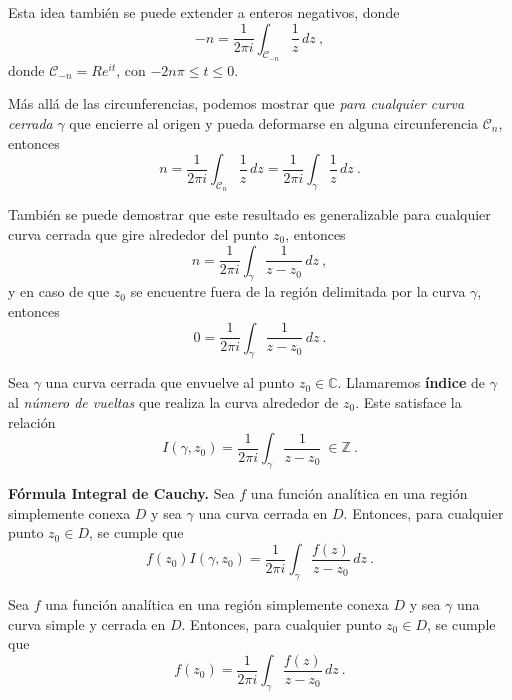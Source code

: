 Esta idea también se puede extender a enteros negativos, donde 
\begin{equation}
    -n = \frac{1}{2\pi i} \int_{\mathcal{C}_{-n}} \frac{1}{z} \, dz \ ,
\end{equation}
donde $\mathcal{C}_{-n} = Re^{it}$, con $-2n\pi \leq t \leq 0$.

Más allá de las circunferencias, podemos mostrar que \emph{para cualquier curva cerrada} $\gamma$ que encierre al origen y pueda deformarse en alguna circunferencia $\mathcal{C}_n$, entonces 
\begin{equation}
    n = \frac{1}{2\pi i} \int_{\mathcal{C}_n} \frac{1}{z} \, dz = \frac{1}{2\pi i} \int_{\gamma} \frac{1}{z} \, dz \ .
\end{equation}

También se puede demostrar que este resultado es generalizable para cualquier curva cerrada que gire alrededor del punto $z_0$, entonces 
\begin{equation*}
    n = \frac{1}{2\pi i} \int_{\gamma} \frac{1}{z-z_0} \, dz \ ,
\end{equation*} 
y en caso de que $z_0$ se encuentre fuera de la región delimitada por la curva $\gamma$, entonces 
\begin{equation*}
    0 = \frac{1}{2\pi i} \int_{\gamma} \frac{1}{z-z_0} \, dz \ .
\end{equation*}

\begin{defi}
    Sea $\gamma$ una curva cerrada que envuelve al punto $z_0 \in \mathbb{C}$. Llamaremos \textbf{índice} de $\gamma$ al \emph{número de vueltas} que realiza la curva alrededor de $z_0$. Este satisface la relación 
    \begin{equation}
        I(\gamma, z_0) = \frac{1}{2\pi i} \int_{\gamma} \frac{1}{z-z_0} \ \in \mathbb{Z} \ .
    \end{equation}
\end{defi}

\begin{teorema}{\textbf{Fórmula Integral de Cauchy.}}
    Sea $f$ una función analítica en una región simplemente conexa $D$ y sea $\gamma$ una curva cerrada en $D$. Entonces, para cualquier punto $z_0 \in D$, se cumple que 
    \begin{equation}
        f(z_0) I(\gamma, z_0) = \frac{1}{2\pi i} \int_\gamma \frac{f(z)}{z-z_0} \, dz \ .
    \end{equation}
\end{teorema}

\begin{corolario}
    Sea $f$ una función analítica en una región simplemente conexa $D$ y sea $\gamma$ una curva simple y cerrada en $D$. Entonces, para cualquier punto $z_0 \in D$, se cumple que 
    \begin{equation}
        f(z_0) = \frac{1}{2\pi i} \int_\gamma \frac{f(z)}{z-z_0} \, dz \ .
    \end{equation}
\end{corolario}

